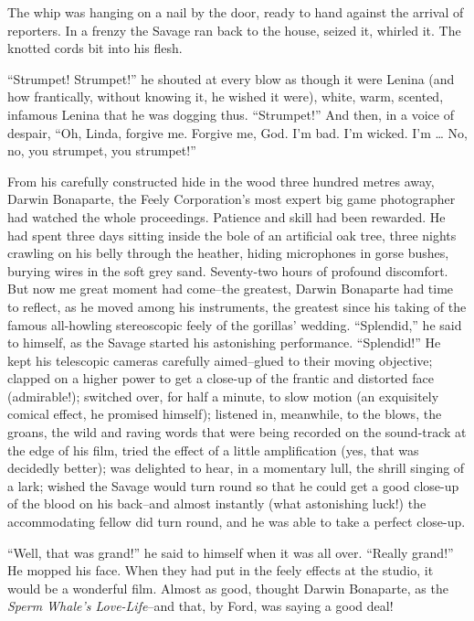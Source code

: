 \documentclass[12pt]{report}
\begin{document}
The whip was hanging on a nail by the door, ready to hand against the
arrival of reporters. In a frenzy the Savage ran back to the house,
seized it, whirled it. The knotted cords bit into his flesh.

``Strumpet! Strumpet!'' he shouted at every blow as though it were
Lenina (and how frantically, without knowing it, he wished it were),
white, warm, scented, infamous Lenina that he was dogging thus.
``Strumpet!'' And then, in a voice of despair, ``Oh, Linda, forgive me.
Forgive me, God. I'm bad. I'm wicked. I'm \ldots{} No, no, you strumpet,
you strumpet!''

From his carefully constructed hide in the wood three hundred metres
away, Darwin Bonaparte, the Feely Corporation's most expert big game
photographer had watched the whole proceedings. Patience and skill had
been rewarded. He had spent three days sitting inside the bole of an
artificial oak tree, three nights crawling on his belly through the
heather, hiding microphones in gorse bushes, burying wires in the soft
grey sand. Seventy-two hours of profound discomfort. But now me great
moment had come--the greatest, Darwin Bonaparte had time to reflect, as
he moved among his instruments, the greatest since his taking of the
famous all-howling stereoscopic feely of the gorillas' wedding.
``Splendid,'' he said to himself, as the Savage started his astonishing
performance. ``Splendid!'' He kept his telescopic cameras carefully
aimed--glued to their moving objective; clapped on a higher power to get
a close-up of the frantic and distorted face (admirable!); switched
over, for half a minute, to slow motion (an exquisitely comical effect,
he promised himself); listened in, meanwhile, to the blows, the groans,
the wild and raving words that were being recorded on the sound-track at
the edge of his film, tried the effect of a little amplification (yes,
that was decidedly better); was delighted to hear, in a momentary lull,
the shrill singing of a lark; wished the Savage would turn round so that
he could get a good close-up of the blood on his back--and almost
instantly (what astonishing luck!) the accommodating fellow did turn
round, and he was able to take a perfect close-up.

``Well, that was grand!'' he said to himself when it was all over.
``Really grand!'' He mopped his face. When they had put in the feely
effects at the studio, it would be a wonderful film. Almost as good,
thought Darwin Bonaparte, as the \emph{Sperm Whale's Love-Life}--and
that, by Ford, was saying a good deal!
\end{document}
